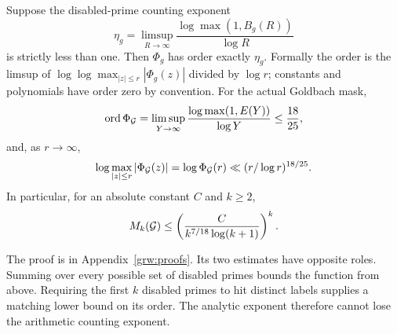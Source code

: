 \begin{theorem}
\label{grw:order}
Suppose the disabled-prime counting exponent
\[
 \eta_g=\limsup_{R\to\infty}
 \frac{\log\max(1,B_g(R))}{\log R}
\]
is strictly less than one.  Then $\Phi_g$ has order exactly $\eta_g$.
Formally the order is the limsup of $\log\log \max_{|z|\le r}|\Phi_g(z)|$
divided by $\log r$; constants and polynomials have order zero by convention.  For the actual
Goldbach mask,
\begin{equation}
 \operatorname{ord}\Phi_{\mathcal G}
 =\limsup_{Y\to\infty}\frac{\log\max(1,E(Y))}{\log Y}
 \le\frac{18}{25},
 \label{grw:goldbach-order}
\end{equation}
and, as $r\to\infty$,
\begin{equation}
 \log\max_{|z|\le r}|\Phi_{\mathcal G}(z)|
 =\log\Phi_{\mathcal G}(r)\ll(r/\log r)^{18/25}.
 \label{grw:quantitative-growth}
\end{equation}
In particular, for an absolute constant $C$ and $k\ge2$,
\begin{equation}
 M_k(\mathcal G)\le
 \left(\frac{C}{k^{7/18}\log(k+1)}\right)^k.
 \label{grw:moment-bound}
\end{equation}
\end{theorem}
The proof is in Appendix~\ref{grw:proofs}.  Its two estimates have
opposite roles.  Summing over every possible set of disabled primes
bounds the function from above.  Requiring the first $k$ disabled
primes to hit distinct labels supplies a matching lower bound on its
order.  The analytic exponent therefore cannot lose the arithmetic
counting exponent.


